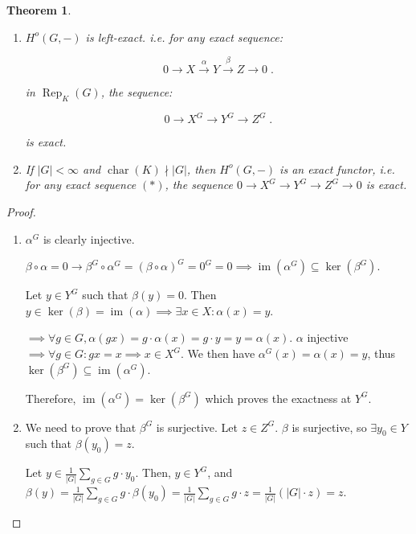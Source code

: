 \documentclass{article}
\theoremstyle{definition}
\theoremstyle{plain}
\newtheorem{theorem}{Theorem}[section]
\theoremstyle{remark}
\begin{document}
    \begin{theorem}
        \begin{enumerate}[label=\roman*)]
            \item \(H^o(G,-)\) is left-exact. i.e. for any exact sequence:
            
            \[
                0 \to X \xrightarrow{\alpha} Y \xrightarrow{\beta} Z \to 0 \;. \tag*{$(\ast)$}
            \]

            in \(\operatorname{Rep}_K(G)\), the sequence:

            \[
                0 \to X^G \to Y^G \to Z^G\;.
            \]

            is exact.

            \item If \(\vert G \vert < \infty\) and \(\operatorname{char}(K) \nmid \vert G \vert\), then \(H^o(G,-)\) is an exact functor, i.e. for any exact sequence \((\ast)\), the sequence \(0 \to X^G \to Y^G \to Z^G \to 0\) is exact.
        \end{enumerate} 
    \end{theorem}

    \begin{proof}
        \begin{enumerate}[label=\roman*)]
            \item \(\alpha^G\) is clearly injective.
            
            \(\beta \circ \alpha = 0 \to \beta^G \circ \alpha^G = (\beta \circ \alpha)^G = 0^G = 0 \implies \operatorname{im}(\alpha^G) \subseteq \ker(\beta^G)\).

            Let \(y\in Y^G\) such that \(\beta(y) = 0\). Then \(y\in \ker(\beta) = \operatorname{im}(\alpha) \implies \exists x\in X : \alpha(x) = y\).

            \(\implies \forall g\in G, \alpha(gx) = g \cdot \alpha(x) = g\cdot y = y = \alpha(x)\). \(\alpha\) injective \(\implies \forall g\in G:  gx = x \implies x \in X^G\). We then have \(\alpha^G(x) = \alpha(x) = y\), thus \(\ker(\beta^G) \subseteq \operatorname{im}(\alpha^G)\).
            
            Therefore, \(\operatorname{im}(\alpha^G) = \ker(\beta^G)\) which proves the exactness at \(Y^G\).

            \item We need to prove that \(\beta^G\) is surjective. Let \(z\in Z^G\). \(\beta\) is surjective, so \(\exists y_0 \in Y\) such that \(\beta(y_0) = z\).
            
            Let \(y \in \frac{1}{\vert G \vert} \sum_{g\in G} g \cdot y_0\). Then, \(y\in Y^G\), and \(\beta(y) = \frac{1}{\vert G \vert} \sum_{g\in G} g \cdot \beta(y_0) = \frac{1}{\vert G \vert} \sum_{g\in G} g \cdot z = \frac{1}{\vert G \vert} (\vert G \vert \cdot z) = z\). 
        \end{enumerate} 
    \end{proof}
\end{document}
